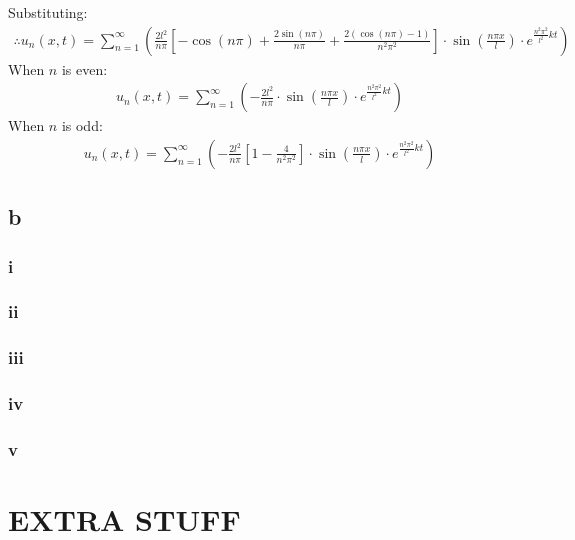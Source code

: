 \documentclass[11pt]{article}
\numberwithin{equation}{section}
\begin{document}
Substituting:
\begin{align}
	\therefore u_n \left(x,t\right) = \sum_{n=1}^{\infty} \left(\frac{2l^2}{n\pi}\left[ -\cos\left(n\pi\right) + \frac{2\sin\left(n\pi\right)}{n\pi} +\frac{2\left(\cos\left(n\pi\right)-1\right)}{n^2\pi^2} \right] \cdot \sin\left(\frac{n\pi x}{l}\right) \cdot e^{\frac{n^2\pi^2}{l^2}kt} \right)
\end{align}
When $n$ is even:
\begin{align}
	u_n \left(x,t\right) = \sum_{n=1}^{\infty} \left( -\frac{2l^2}{n\pi} \cdot \sin\left(\frac{n\pi x}{l}\right) \cdot e^{\frac{n^2\pi^2}{l^2}kt} \right)
\end{align}
When $n$ is odd:
\begin{align}
	u_n \left(x,t\right) = \sum_{n=1}^{\infty} \left( -\frac{2l^2}{n\pi}\left[1 - \frac{4}{n^2\pi^2}\right] \cdot \sin\left(\frac{n\pi x}{l}\right) \cdot e^{\frac{n^2\pi^2}{l^2}kt} \right)
\end{align}
\subsection*{b}
\subsubsection*{i}
\subsubsection*{ii}
\subsubsection*{iii}
\subsubsection*{iv}
\subsubsection*{v}
\section{EXTRA STUFF}
\end{document}
